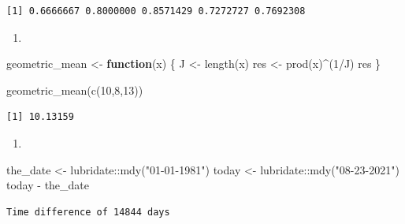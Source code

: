 \documentclass[
  letterpaper,
  DIV=11,
  numbers=noendperiod]{scrreprt}
\newenvironment{Shaded}{\begin{snugshade}}{\end{snugshade}}
\newcommand{\ControlFlowTok}[1]{\textcolor[rgb]{0.00,0.23,0.31}{\textbf{#1}}}
\newcommand{\DecValTok}[1]{\textcolor[rgb]{0.68,0.00,0.00}{#1}}
\newcommand{\FunctionTok}[1]{\textcolor[rgb]{0.28,0.35,0.67}{#1}}
\newcommand{\NormalTok}[1]{\textcolor[rgb]{0.00,0.23,0.31}{#1}}
\newcommand{\OtherTok}[1]{\textcolor[rgb]{0.00,0.23,0.31}{#1}}
\newcommand{\SpecialCharTok}[1]{\textcolor[rgb]{0.37,0.37,0.37}{#1}}
\newcommand{\StringTok}[1]{\textcolor[rgb]{0.13,0.47,0.30}{#1}}
\providecommand{\tightlist}{%
  \setlength{\itemsep}{0pt}\setlength{\parskip}{0pt}}\usepackage{longtable,booktabs,array}
\begin{document}
\begin{verbatim}
[1] 0.6666667 0.8000000 0.8571429 0.7272727 0.7692308
\end{verbatim}

\begin{enumerate}
\def\labelenumi{\arabic{enumi}.}
\setcounter{enumi}{1}
\tightlist
\item
\end{enumerate}

\begin{Shaded}
\begin{Highlighting}[]
\NormalTok{geometric\_mean }\OtherTok{\textless{}{-}} \ControlFlowTok{function}\NormalTok{(x) \{}
\NormalTok{  J }\OtherTok{\textless{}{-}} \FunctionTok{length}\NormalTok{(x)}
\NormalTok{  res }\OtherTok{\textless{}{-}} \FunctionTok{prod}\NormalTok{(x)}\SpecialCharTok{\^{}}\NormalTok{(}\DecValTok{1}\SpecialCharTok{/}\NormalTok{J)}
\NormalTok{  res}
\NormalTok{\}}

\FunctionTok{geometric\_mean}\NormalTok{(}\FunctionTok{c}\NormalTok{(}\DecValTok{10}\NormalTok{,}\DecValTok{8}\NormalTok{,}\DecValTok{13}\NormalTok{))}
\end{Highlighting}
\end{Shaded}

\begin{verbatim}
[1] 10.13159
\end{verbatim}

\begin{enumerate}
\def\labelenumi{\arabic{enumi}.}
\setcounter{enumi}{2}
\tightlist
\item
\end{enumerate}

\begin{Shaded}
\begin{Highlighting}[]
\NormalTok{the\_date }\OtherTok{\textless{}{-}}\NormalTok{ lubridate}\SpecialCharTok{::}\FunctionTok{mdy}\NormalTok{(}\StringTok{"01{-}01{-}1981"}\NormalTok{)}
\NormalTok{today }\OtherTok{\textless{}{-}}\NormalTok{ lubridate}\SpecialCharTok{::}\FunctionTok{mdy}\NormalTok{(}\StringTok{"08{-}23{-}2021"}\NormalTok{)}
\NormalTok{today }\SpecialCharTok{{-}}\NormalTok{ the\_date}
\end{Highlighting}
\end{Shaded}

\begin{verbatim}
Time difference of 14844 days
\end{verbatim}
\end{document}
